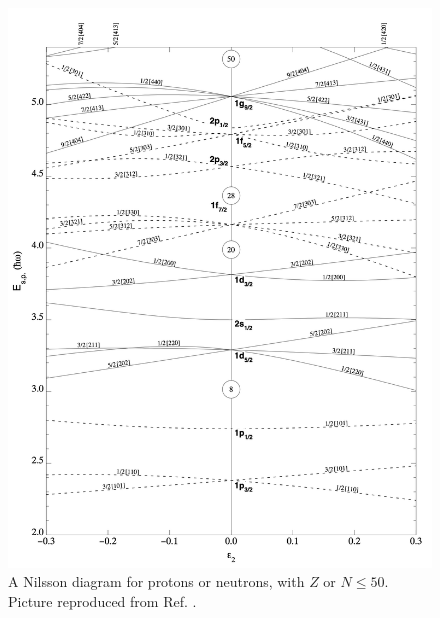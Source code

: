 \begin{figure}
    \centering
    \includegraphics[scale=0.185]{Chapters/Figures/nillson_diagram.png}
    \caption{A Nilsson diagram for protons or neutrons, with $Z$ or $N\leq50$. Picture reproduced from Ref. \cite{ragnarsson2005shapes}.}
    \label{nillson-diagram}
\end{figure}

